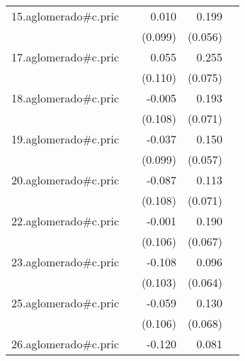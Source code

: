 {\begin{longtable}{l*{4}{D{.}{.}{-1}}}
\addlinespace
15.aglomerado#c.pric&                     &       0.010         &       0.199\sym{***}&                     \\
            &                     &     (0.099)         &     (0.056)         &                     \\
\addlinespace
17.aglomerado#c.pric&                     &       0.055         &       0.255\sym{***}&                     \\
            &                     &     (0.110)         &     (0.075)         &                     \\
\addlinespace
18.aglomerado#c.pric&                     &      -0.005         &       0.193\sym{**} &                     \\
            &                     &     (0.108)         &     (0.071)         &                     \\
\addlinespace
19.aglomerado#c.pric&                     &      -0.037         &       0.150\sym{**} &                     \\
            &                     &     (0.099)         &     (0.057)         &                     \\
\addlinespace
20.aglomerado#c.pric&                     &      -0.087         &       0.113         &                     \\
            &                     &     (0.108)         &     (0.071)         &                     \\
\addlinespace
22.aglomerado#c.pric&                     &      -0.001         &       0.190\sym{**} &                     \\
            &                     &     (0.106)         &     (0.067)         &                     \\
\addlinespace
23.aglomerado#c.pric&                     &      -0.108         &       0.096         &                     \\
            &                     &     (0.103)         &     (0.064)         &                     \\
\addlinespace
25.aglomerado#c.pric&                     &      -0.059         &       0.130         &                     \\
            &                     &     (0.106)         &     (0.068)         &                     \\
\addlinespace
26.aglomerado#c.pric&                     &      -0.120         &       0.081         &                     \\

\end{longtable}}
